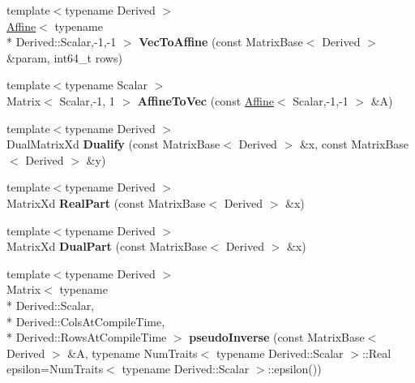 \begin{DoxyCompactItemize}
\item 
\hypertarget{namespace_d_r_d_s_p_a06706d709929ab3943baffd95a0b332c}{{\footnotesize template$<$typename Derived $>$ }\\\hyperlink{struct_d_r_d_s_p_1_1_affine}{Affine}$<$ typename \\*
Derived\-::\-Scalar,-\/1,-\/1 $>$ {\bfseries Vec\-To\-Affine} (const Matrix\-Base$<$ Derived $>$ \&param, int64\-\_\-t rows)}\label{namespace_d_r_d_s_p_a06706d709929ab3943baffd95a0b332c}

\item 
\hypertarget{namespace_d_r_d_s_p_a6ade4d90b302773f4a3b938e54301f32}{{\footnotesize template$<$typename Scalar $>$ }\\Matrix$<$ Scalar,-\/1, 1 $>$ {\bfseries Affine\-To\-Vec} (const \hyperlink{struct_d_r_d_s_p_1_1_affine}{Affine}$<$ Scalar,-\/1,-\/1 $>$ \&A)}\label{namespace_d_r_d_s_p_a6ade4d90b302773f4a3b938e54301f32}

\item 
\hypertarget{namespace_d_r_d_s_p_afc669f9f4960f272232d92a693e07b41}{{\footnotesize template$<$typename Derived $>$ }\\Dual\-Matrix\-Xd {\bfseries Dualify} (const Matrix\-Base$<$ Derived $>$ \&x, const Matrix\-Base$<$ Derived $>$ \&y)}\label{namespace_d_r_d_s_p_afc669f9f4960f272232d92a693e07b41}

\item 
\hypertarget{namespace_d_r_d_s_p_a5a4a504382ad5845be8d509a341f2ae3}{{\footnotesize template$<$typename Derived $>$ }\\Matrix\-Xd {\bfseries Real\-Part} (const Matrix\-Base$<$ Derived $>$ \&x)}\label{namespace_d_r_d_s_p_a5a4a504382ad5845be8d509a341f2ae3}

\item 
\hypertarget{namespace_d_r_d_s_p_a293161a052cb516e81d0285d726c1bf8}{{\footnotesize template$<$typename Derived $>$ }\\Matrix\-Xd {\bfseries Dual\-Part} (const Matrix\-Base$<$ Derived $>$ \&x)}\label{namespace_d_r_d_s_p_a293161a052cb516e81d0285d726c1bf8}

\item 
\hypertarget{namespace_d_r_d_s_p_a382b480192fb2dc8c95cde39a64e7734}{{\footnotesize template$<$typename Derived $>$ }\\Matrix$<$ typename \\*
Derived\-::\-Scalar, \\*
Derived\-::\-Cols\-At\-Compile\-Time, \\*
Derived\-::\-Rows\-At\-Compile\-Time $>$ {\bfseries pseudo\-Inverse} (const Matrix\-Base$<$ Derived $>$ \&A, typename Num\-Traits$<$ typename Derived\-::\-Scalar $>$\-::Real epsilon=Num\-Traits$<$ typename Derived\-::\-Scalar $>$\-::epsilon())}\label{namespace_d_r_d_s_p_a382b480192fb2dc8c95cde39a64e7734}


\end{DoxyCompactItemize}
